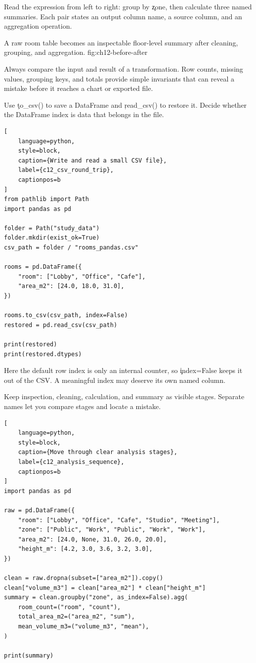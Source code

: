 Read the expression from left to right: group by \c{zone}, then calculate three
named summaries. Each pair states an output column name, a source column, and
an aggregation operation.

{A raw room table becomes an inspectable floor-level summary after cleaning, grouping, and aggregation.}
{fig:ch12-before-after}

Always compare the input and result of a transformation. Row counts, missing
values, grouping keys, and totals provide simple invariants that can reveal a
mistake before it reaches a chart or exported file.


Use \c{to_csv()} to save a DataFrame and \c{read_csv()} to restore it. Decide
whether the DataFrame index is data that belongs in the file.

\begin{lstlisting}[
    language=python,
    style=block,
    caption={Write and read a small CSV file},
    label={c12_csv_round_trip},
    captionpos=b
]
from pathlib import Path
import pandas as pd

folder = Path("study_data")
folder.mkdir(exist_ok=True)
csv_path = folder / "rooms_pandas.csv"

rooms = pd.DataFrame({
    "room": ["Lobby", "Office", "Cafe"],
    "area_m2": [24.0, 18.0, 31.0],
})

rooms.to_csv(csv_path, index=False)
restored = pd.read_csv(csv_path)

print(restored)
print(restored.dtypes)
\end{lstlisting}

Here the default row index is only an internal counter, so \c{index=False}
keeps it out of the CSV. A meaningful index may deserve its own named column.


Keep inspection, cleaning, calculation, and summary as visible stages. Separate
names let you compare stages and locate a mistake.

\begin{lstlisting}[
    language=python,
    style=block,
    caption={Move through clear analysis stages},
    label={c12_analysis_sequence},
    captionpos=b
]
import pandas as pd

raw = pd.DataFrame({
    "room": ["Lobby", "Office", "Cafe", "Studio", "Meeting"],
    "zone": ["Public", "Work", "Public", "Work", "Work"],
    "area_m2": [24.0, None, 31.0, 26.0, 20.0],
    "height_m": [4.2, 3.0, 3.6, 3.2, 3.0],
})

clean = raw.dropna(subset=["area_m2"]).copy()
clean["volume_m3"] = clean["area_m2"] * clean["height_m"]
summary = clean.groupby("zone", as_index=False).agg(
    room_count=("room", "count"),
    total_area_m2=("area_m2", "sum"),
    mean_volume_m3=("volume_m3", "mean"),
)

print(summary)
\end{lstlisting}

